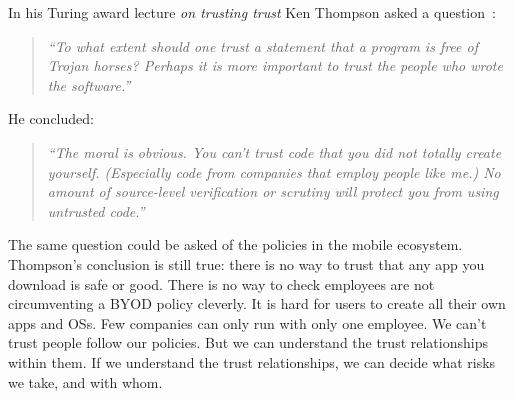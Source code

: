 \documentclass[thesis.tex]{subfiles}
\begin{document}
\noindent In his Turing award lecture \emph{on trusting trust} Ken
Thompson asked a question~\cite{ken_thompson_reflections_1984}:
\begin{quotation}\itshape\noindent
  ``To what extent should one trust a statement that a program is free
  of Trojan horses? Perhaps it is more important to trust the people who
  wrote the software.''
\end{quotation}
He concluded:
\begin{quotation}\itshape\noindent
  ``The moral is obvious. You can't trust code that you did not
  totally create yourself. (Especially code from companies that employ
  people like me.)  No amount of source-level verification or scrutiny
  will protect you from using untrusted code.''
\end{quotation} 
The same question could be asked of the policies in the mobile
ecosystem. Thompson's conclusion is still true: there is no way to
trust that any app you download is safe or good. There is no way to
check employees are not circumventing a BYOD policy cleverly. It is
hard for users to create all their own apps and OSs. Few companies can
only run with only one employee. We can't trust people follow our
policies. But we can understand the trust relationships within
them. If we understand the trust relationships, we can decide what
risks we take, and with whom.
\end{document}
